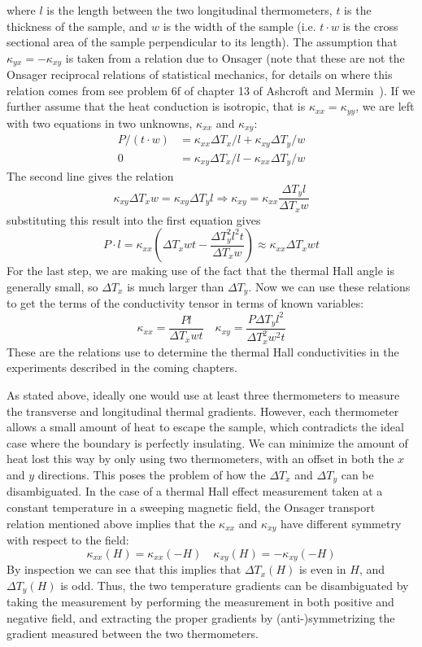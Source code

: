 \documentclass{thesis-umich}
\begin{document}
where $l$ is the length between the two longitudinal thermometers, $t$ is the thickness of the sample, and $w$ is the width of the sample (i.e. $t\cdot w$ is the cross sectional area of the sample perpendicular to its length). The assumption that $\kappa_{yx} = - \kappa_{xy}$ is taken from a relation due to Onsager (note that these are not the Onsager reciprocal relations of statistical mechanics, for details on where this relation comes from see problem 6f of chapter 13 of Ashcroft and Mermin~\cite{AshcroftMermin}). If we further assume that the heat conduction is isotropic, that is $\kappa_{xx} = \kappa_{yy}$, we are left with two equations in two unknowns, $\kappa_{xx}$ and $\kappa_{xy}$:
\begin{align*}
		P / (t \cdot w) &=  \kappa_{xx} \Delta T_x / l + \kappa_{xy} \Delta T_y / w \\
		0 &= \kappa_{xy} \Delta T_x / l - \kappa_{xx} \Delta T_y /w 
	\end{align*}
The second line gives the relation
\[ \kappa_{xy} \Delta T_x w = \kappa_{xy} \Delta T_y l \Rightarrow \kappa_{xy} = \kappa_{xx} \frac{\Delta T_y l}{\Delta T_x w} \]
substituting this result into the first equation gives
\[ P \cdot l = \kappa_{xx} \left( \Delta T_x w t - \frac{\Delta T_y^2 l^2 t}{\Delta T_x w} \right) \approx \kappa_{xx} \Delta T_x w t\]
For the last step, we are making use of the fact that the thermal Hall angle is generally small, so $\Delta T_x$ is much larger than $\Delta T_y$. Now we can use these relations to get the terms of the conductivity tensor in terms of known variables:
\[\kappa_{xx} = \frac{P l}{\Delta T_x wt} \quad \kappa_{xy} = \frac{P \Delta T_y l^2}{\Delta T_x^2 w^2t} \]
These are the relations use to determine the thermal Hall conductivities in the experiments described in the coming chapters.

As stated above, ideally one would use at least three thermometers to measure the transverse and longitudinal thermal gradients. However, each thermometer allows a small amount of heat to escape the sample, which contradicts the ideal case where the boundary is perfectly insulating. We can minimize the amount of heat lost this way by only using two thermometers, with an offset in both the $x$ and $y$ directions. This poses the problem of how the $\Delta T_x$ and $\Delta T_y$ can be disambiguated. In the case of a thermal Hall effect measurement taken at a constant temperature in a sweeping magnetic field, the Onsager transport relation mentioned above implies that the $\kappa_{xx}$ and $\kappa_{xy}$ have different symmetry with respect to the field:
\[ \kappa_{xx}(H) = \kappa_{xx}(-H) \quad \kappa_{xy}(H) = -\kappa_{xy}(-H) \]
By inspection we can see that this implies that $\Delta T_x(H)$ is even in $H$, and $\Delta T_y(H)$ is odd. Thus, the two temperature gradients can be disambiguated by taking the measurement by performing the measurement in both positive and negative field, and extracting the proper gradients by (anti-)symmetrizing the gradient measured between the two thermometers.
\end{document}
